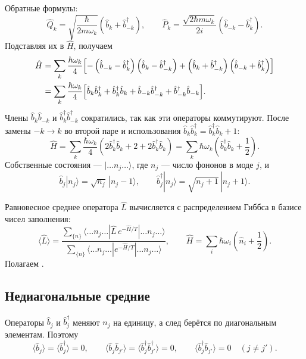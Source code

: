 \documentclass[../final.tex]{subfiles}
\begin{document}
Обратные формулы:
\[
    \hat Q_k=\sqrt{\frac{\hbar}{2m\omega_k}}
       \left(\hat b_k+\hat b_{-k}^\dagger\right),\qquad
    \hat P_k=\frac{\sqrt{2\hbar m\omega_k}}{2i}
       \left(\hat b_{-k}-\hat b_k^\dagger\right).
\]
Подставляя их в $\hat H$, получаем
\begin{align*}
    \hat H&=\sum_k\frac{\hbar\omega_k}4\Bigl[
       -\left(\hat b_{-k}-\hat b_k^\dagger\right)
        \left(\hat b_k-\hat b_{-k}^\dagger\right)
       +\left(\hat b_k+\hat b_{-k}^\dagger\right)
        \left(\hat b_{-k}+\hat b_k^\dagger\right)\Bigr]\\
    &=\sum_k\frac{\hbar\omega_k}4\Bigl[
       \hat b_k\hat b_k^\dagger+\hat b_k^\dagger\hat b_k
       +\hat b_{-k}\hat b_{-k}^\dagger+\hat b_{-k}^\dagger\hat b_{-k}\Bigr].
\end{align*}
Члены $\hat b_k\hat b_{-k}$ и $\hat b_k^\dagger\hat b_{-k}^\dagger$
сократились, так как эти операторы коммутируют.
После замены $-k\to k$ во второй паре и использования
$\hat b_k\hat b_k^\dagger=\hat b_k^\dagger\hat b_k+1$:
\[
    \hat H=\sum_k\frac{\hbar\omega_k}4
       \left(2\hat b_k^\dagger\hat b_k+2+2\hat b_k^\dagger\hat b_k\right)
     =\sum_k\hbar\omega_k\left(\hat b_k^\dagger\hat b_k+\frac12\right).
\]
Собственные состояния --- $|\ldots n_j\ldots\rangle$, где $n_j$ ---
число фононов в моде $j$, и
\[
    \hat b_j|n_j\rangle=\sqrt{n_j}\,|n_j-1\rangle,\qquad
    \hat b_j^\dagger|n_j\rangle=\sqrt{n_j+1}\,|n_j+1\rangle.
\]


Равновесное среднее оператора $\hat L$ вычисляется с распределением
Гиббса в базисе чисел заполнения:
\[
    \langle\hat L\rangle=
    \frac{\sum_{\{n\}}\langle\ldots n_j\ldots|\hat L\,
          e^{-\hat H/T}|\ldots n_j\ldots\rangle}
         {\sum_{\{n\}}\langle\ldots n_j\ldots|
          e^{-\hat H/T}|\ldots n_j\ldots\rangle},
    \qquad
    \hat H=\sum_i\hbar\omega_i\left(\hat n_i+\frac12\right).
\]
Полагаем .

\subsection*{Недиагональные средние}

Операторы $\hat b_j$ и $\hat b_j^\dagger$ меняют $n_j$ на единицу,
а след берётся по диагональным элементам. Поэтому
\[
    \langle\hat b_j\rangle=\langle\hat b_j^\dagger\rangle=0,\qquad
    \langle\hat b_j\hat b_{j'}\rangle
      =\langle\hat b_j^\dagger\hat b_{j'}^\dagger\rangle=0,\qquad
    \langle\hat b_j^\dagger\hat b_{j'}\rangle=0\quad(j\ne j').
\]
\end{document}
